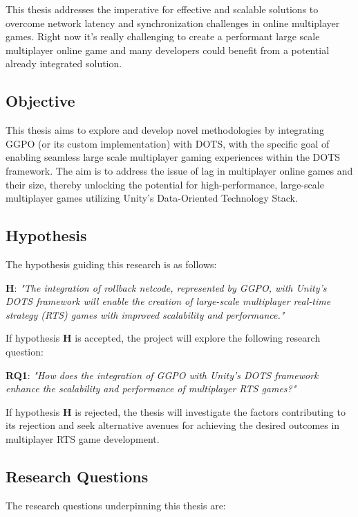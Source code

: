 This thesis addresses the imperative for effective and scalable solutions to overcome network latency and synchronization challenges in online multiplayer games. Right now it's really challenging to create a performant large scale multiplayer online game and many developers could benefit from a potential already integrated solution.

\subsection{Objective}

This thesis aims to explore and develop novel methodologies by integrating GGPO (or its custom implementation) with DOTS, with the specific goal of enabling seamless large scale multiplayer gaming experiences within the DOTS framework. The aim is to address the issue of lag in multiplayer online games and their size, thereby unlocking the potential for high-performance, large-scale multiplayer games utilizing Unity's Data-Oriented Technology Stack.

\subsection{Hypothesis}

The hypothesis guiding this research is as follows:

\textbf{H}: \textit{"The integration of rollback netcode, represented by GGPO, with Unity's DOTS framework will enable the creation of large-scale multiplayer real-time strategy (RTS) games with improved scalability and performance."}\newline

If hypothesis \textbf{H} is accepted, the project will explore the following research question:

\textbf{RQ1}: \textit{"How does the integration of GGPO with Unity's DOTS framework enhance the scalability and performance of multiplayer RTS games?"}\newline

If hypothesis \textbf{H} is rejected, the thesis will investigate the factors contributing to its rejection and seek alternative avenues for achieving the desired outcomes in multiplayer RTS game development.

\subsection{Research Questions}

The research questions underpinning this thesis are:

